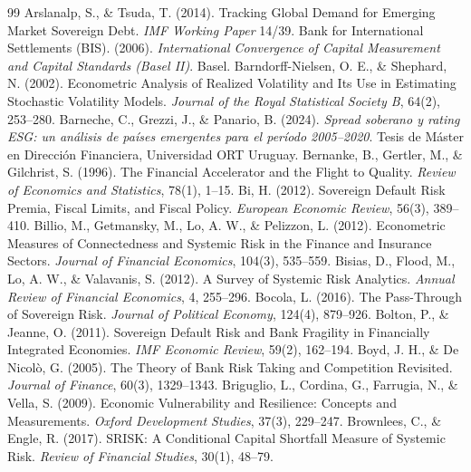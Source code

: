 \begin{thebibliography}{99}
 Arslanalp, S., \& Tsuda, T. (2014). Tracking Global Demand for Emerging Market Sovereign Debt. \textit{IMF Working Paper} 14/39.
 Bank for International Settlements (BIS). (2006). \textit{International Convergence of Capital Measurement and Capital Standards (Basel II)}. Basel.
 Barndorff-Nielsen, O. E., \& Shephard, N. (2002). Econometric Analysis of Realized Volatility and Its Use in Estimating Stochastic Volatility Models. \textit{Journal of the Royal Statistical Society B}, 64(2), 253--280.
 Barneche, C., Grezzi, J., \& Panario, B. (2024). \textit{Spread soberano y rating ESG: un análisis de países emergentes para el período 2005--2020}. Tesis de Máster en Dirección Financiera, Universidad ORT Uruguay.
 Bernanke, B., Gertler, M., \& Gilchrist, S. (1996). The Financial Accelerator and the Flight to Quality. \textit{Review of Economics and Statistics}, 78(1), 1--15.
 Bi, H. (2012). Sovereign Default Risk Premia, Fiscal Limits, and Fiscal Policy. \textit{European Economic Review}, 56(3), 389--410.
 Billio, M., Getmansky, M., Lo, A. W., \& Pelizzon, L. (2012). Econometric Measures of Connectedness and Systemic Risk in the Finance and Insurance Sectors. \textit{Journal of Financial Economics}, 104(3), 535--559.
 Bisias, D., Flood, M., Lo, A. W., \& Valavanis, S. (2012). A Survey of Systemic Risk Analytics. \textit{Annual Review of Financial Economics}, 4, 255--296.
 Bocola, L. (2016). The Pass-Through of Sovereign Risk. \textit{Journal of Political Economy}, 124(4), 879--926.
 Bolton, P., \& Jeanne, O. (2011). Sovereign Default Risk and Bank Fragility in Financially Integrated Economies. \textit{IMF Economic Review}, 59(2), 162--194.
 Boyd, J. H., \& De Nicolò, G. (2005). The Theory of Bank Risk Taking and Competition Revisited. \textit{Journal of Finance}, 60(3), 1329--1343.
 Briguglio, L., Cordina, G., Farrugia, N., \& Vella, S. (2009). Economic Vulnerability and Resilience: Concepts and Measurements. \textit{Oxford Development Studies}, 37(3), 229--247.
 Brownlees, C., \& Engle, R. (2017). SRISK: A Conditional Capital Shortfall Measure of Systemic Risk. \textit{Review of Financial Studies}, 30(1), 48--79.

\end{thebibliography}
